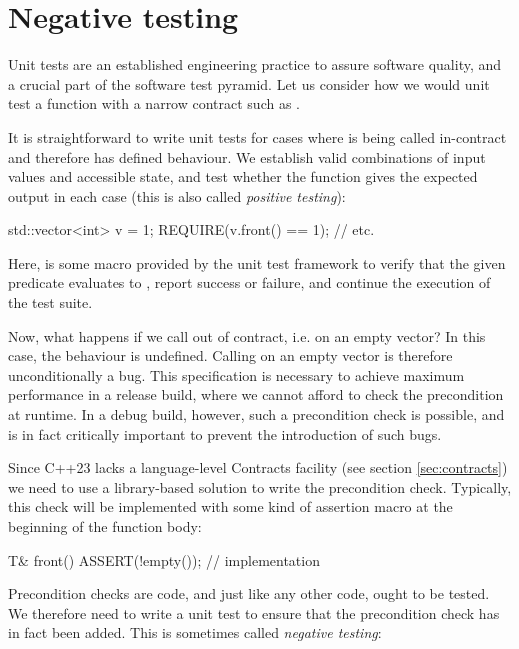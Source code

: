 \section{Negative testing}
\label{sec:negativetest}

Unit tests are an established engineering practice to assure software quality, and a crucial part of the software test pyramid. Let us consider how we would unit test a function with a narrow contract such as .

It is straightforward to write unit tests for cases where  is being called in-contract and therefore has defined behaviour. We establish valid combinations of input values and accessible state, and test whether the function gives the expected output in each case (this is also called \emph{positive testing}):
\begin{codeblock}
std::vector<int> v = {1};
REQUIRE(v.front() == 1);
// etc.
\end{codeblock}
Here,  is some macro provided by the unit test framework to verify that the given predicate evaluates to , report success or failure, and continue the execution of the test suite.

Now, what happens if we call  out of contract, i.e. on an empty vector? In this case, the behaviour is undefined. Calling  on an empty vector is therefore unconditionally a bug. This specification is necessary to achieve maximum performance in a release build, where we cannot afford to check the precondition at runtime. In a debug build, however, such a precondition check is possible, and is in fact critically important to prevent the introduction of such bugs.

Since C++23 lacks a language-level Contracts facility (see section \ref{sec:contracts}) we need to use a library-based solution to write the precondition check. Typically, this check will be implemented with some kind of assertion macro at the beginning of the function body:
\begin{codeblock}
T& front() {
  ASSERT(!empty());
  // implementation
}
\end{codeblock}


Precondition checks are code, and just like any other code, ought to be tested. We therefore need to write a unit test to ensure that the precondition check has in fact been added. This is sometimes called \emph{negative testing}:

\pagebreak %

